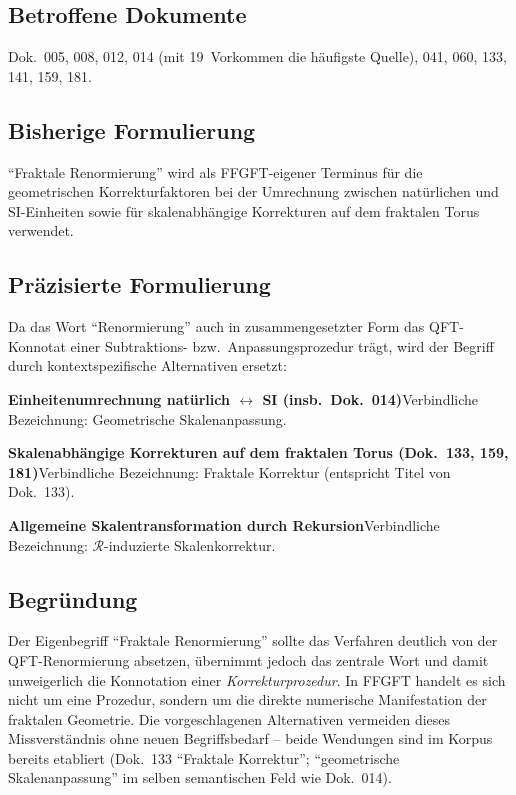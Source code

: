 \subsection*{Betroffene Dokumente}

Dok.~005, 008, 012, 014 (mit 19~Vorkommen die häufigste Quelle),
041, 060, 133, 141, 159, 181.

\subsection*{Bisherige Formulierung}

\enquote{Fraktale Renormierung} wird als FFGFT-eigener Terminus für die
geometrischen Korrekturfaktoren bei der Umrechnung zwischen
natürlichen und SI-Einheiten sowie für skalenabhängige Korrekturen
auf dem fraktalen Torus verwendet.

\subsection*{Präzisierte Formulierung}

Da das Wort \enquote{Renormierung} auch in zusammengesetzter Form
das QFT-Konnotat einer Subtraktions- bzw.\ Anpassungsprozedur trägt,
wird der Begriff durch kontextspezifische Alternativen ersetzt:

\smallskip\noindent \textbf{Einheitenumrechnung natürlich $\leftrightarrow$ SI (insb.\ Dok.~014)}\quad Verbindliche Bezeichnung: Geometrische Skalenanpassung.

\smallskip\noindent \textbf{Skalenabhängige Korrekturen auf dem fraktalen Torus (Dok.~133, 159, 181)}\quad Verbindliche Bezeichnung: Fraktale Korrektur (entspricht Titel von Dok.~133).

\smallskip\noindent \textbf{Allgemeine Skalentransformation durch Rekursion}\quad Verbindliche Bezeichnung: $\mathcal{R}$-induzierte Skalenkorrektur.

\medskip


\subsection*{Begründung}

Der Eigenbegriff \enquote{Fraktale Renormierung} sollte das Verfahren
deutlich von der QFT-Renormierung absetzen, übernimmt jedoch das
zentrale Wort und damit unweigerlich die Konnotation einer
\emph{Korrekturprozedur}. In FFGFT handelt es sich nicht um eine
Prozedur, sondern um die direkte numerische Manifestation der
fraktalen Geometrie. Die vorgeschlagenen Alternativen vermeiden
dieses Missverständnis ohne neuen Begriffsbedarf -- beide Wendungen
sind im Korpus bereits etabliert (Dok.~133 \enquote{Fraktale Korrektur};
\enquote{geometrische Skalenanpassung} im selben semantischen Feld
wie Dok.~014).

